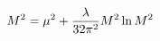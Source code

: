 \begin{equation}
\label{sedici}
M^2=  \mu ^2  + {\lambda \over {32 \pi ^ 2}} M^2 \ln{M^2}
\end{equation}

